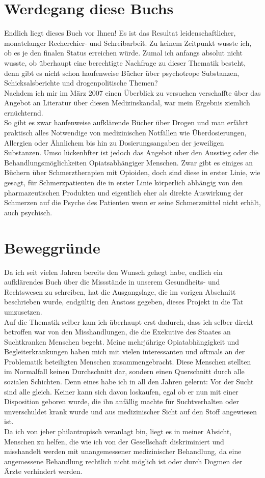 \documentclass[b5paper,10pt,dvips,fleqn,titlepage,twoside]{book}
\begin{document}
\section{Werdegang diese Buchs}
Endlich liegt dieses Buch vor Ihnen! Es ist das Resultat leidenschaftlicher, monatelanger Recherchier- und Schreibarbeit. Zu keinem Zeitpunkt wusste ich, ob es je den finalen Status erreichen würde. Zumal ich anfangs absolut nicht wusste, ob überhaupt eine berechtigte Nachfrage zu dieser Thematik besteht, denn gibt es nicht schon haufenweise Bücher über psychotrope Substanzen, Schicksalsberichte und drogenpolitische Themen?\\
Nachdem ich mir im März 2007 einen Überblick zu versuchen verschaffte über das Angebot an Literatur über diesen Medizinskandal, war mein Ergebnis ziemlich ernüchternd.\\
So gibt es zwar haufenweise aufklärende Bücher über Drogen und man erfährt praktisch alles Notwendige von medizinischen Notfällen wie Überdosierungen, Allergien oder Ähnlichem bis hin zu Dosierungsangaben der jeweiligen Substanzen. Umso lückenhfter ist jedoch das Angebot über den Ausstieg oder die Behandlungsmöglichkeiten Opiatsabhängiger Menschen. Zwar gibt es einiges an Büchern über Schmerztherapien mit Opioiden, doch sind diese in erster Linie, wie gesagt, für Schmerzpatienten die in erster Linie körperlich abhängig von den pharmazeutischen Produkten und eigentlich eher als direkte Auswirkung der Schmerzen auf die Psyche des Patienten wenn er seine Schmerzmittel nicht erhält, auch psychisch.\\
\section{Beweggründe}
Da ich seit vielen Jahren bereits den Wunsch gehegt habe, endlich ein aufklärendes Buch über die Missstände in unserem Gesundheits- und Rechtswesen zu schreiben, hat die Ausgangslage, die im vorigen Abschnitt beschrieben wurde, endgültig den Anstoss gegeben, dieses Projekt in die Tat umzusetzen.\\
Auf die Thematik selber kam ich überhaupt erst dadurch, dass ich selber direkt betroffen war von den Misshandlungen, die die Exekutive des Staates an Suchtkranken Menschen begeht. Meine mehrjährige Opiatabhängigkeit und Begleiterkrankungen haben mich mit vielen interessanten und oftmals an der Problematik beteiligten Menschen zusammengebracht. Diese Menschen stellten im Normalfall keinen Durchschnitt dar, sondern einen Querschnitt durch alle sozialen Schichten. Denn eines habe ich in all den Jahren gelernt: Vor der Sucht sind alle gleich. Keiner kann sich davon loskaufen, egal ob er nun mit einer Disposition geboren wurde, die ihn anfällig machte für Suchtverhalten oder unverschuldet krank wurde und aus medizinischer Sicht auf den Stoff angewiesen ist.\\
Da ich von jeher philantropisch veranlagt bin, liegt es in meiner Absicht, Menschen zu helfen, die wie ich von der Gesellschaft diskriminiert und misshandelt werden mit unangemessener medizinischer Behandlung, da eine angemessene Behandlung rechtlich nicht möglich ist oder durch Dogmen der Ärzte verhindert werden.
\end{document}
